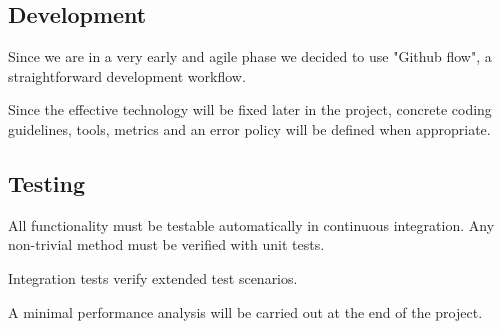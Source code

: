\documentclass[a4paper]{article}
\begin{document}
\subsection{Development}

Since we are in a very early and agile phase we decided to use "Github flow", a straightforward development workflow.

Since the effective technology will be fixed later in the project, concrete coding guidelines, tools, metrics and an error policy will be defined when appropriate.


\subsection{Testing}
All functionality must be testable automatically in continuous integration. Any non-trivial method must be verified with unit tests.

Integration tests verify extended test scenarios.

A minimal performance analysis will be carried out at the end of the project.



\end{document}
